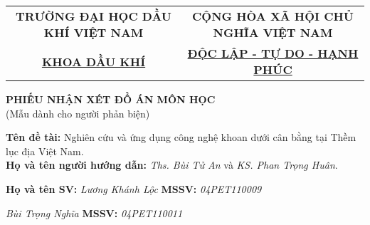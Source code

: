 \documentclass[12pt,a4paper]{article}
\begin{document}
\newpage
\begin{table}[h]
\centering
\label{my-label}
\begin{tabular}{cc}
 \textbf{TRƯỜNG ĐẠI HỌC DẦU KHÍ VIỆT NAM} & \textbf{CỘNG HÒA XÃ HỘI CHỦ NGHĨA VIỆT NAM} \\
 \underline{\textbf{KHOA DẦU KHÍ}}& \underline{\textbf{ĐỘC LẬP - TỰ DO - HẠNH PHÚC}}
\end{tabular}
\end{table}
\begin{center}
	\centering
	\textbf{PHIẾU NHẬN XÉT ĐỒ ÁN MÔN HỌC}\\
	(Mẫu dành cho người phản biện)
\end{center}
\textbf{Tên đề tài:} Nghiên cứu và ứng dụng công nghệ khoan dưới cân bằng tại Thềm lục địa Việt Nam.\\
\textbf{Họ và tên người hướng dẫn:} \textit{Ths. Bùi Tử An} và \textit{KS. Phan Trọng Huân}.

\textbf{Họ và tên SV:} \textit{Lương Khánh Lộc} \hspace{98pt} \textbf{MSSV:} \textit{04PET110009} 

\hspace{68pt} \textit{Bùi Trọng Nghĩa} \hspace{107pt} \textbf{MSSV:} \textit{04PET110011}
\end{document}
